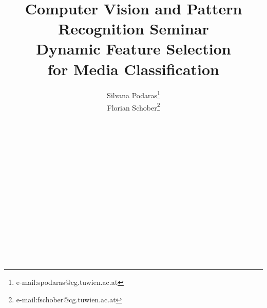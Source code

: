 \documentclass[conference,onecolumn]{acmsiggraph}
\title{
{
\phantom
\bigskip \\ \bigskip \\ \bigskip \\  \bigskip \\ 
\bigskip \\ \bigskip \\  \bigskip \\  \bigskip \\ 
\bigskip \\ \bigskip \\  \bigskip \\  \bigskip \\ 
\bigskip \\ \bigskip \\  \bigskip \\  \bigskip \\ 
\bigskip \\ \bigskip \\  \bigskip \\  \bigskip \\ 
\LARGE Computer Vision and Pattern Recognition Seminar } 
 \\ \medskip
 {\fontsize{36}{48} \selectfont 
  Dynamic Feature Selection
  \\ \medskip 
   for Media Classification}}
\author{Silvana Podaras\thanks{e-mail:spodaras@cg.tuwien.ac.at}\\Florian Schober\thanks{e-mail:fschober@cg.tuwien.ac.at}}
\begin{document}
\fontsize{10}{12} \selectfont
\renewcommand{\abstractname}{\fontsize{10}{12} \selectfont Abstract}


\maketitle
\copyrightspace
\bigskip \\ \bigskip \\ \bigskip \\  \bigskip \\ 
\bigskip \\ \bigskip \\  \bigskip \\  \bigskip \\ 
\bigskip \\ \bigskip \\  \bigskip \\  \bigskip \\ 

\newpage

\tableofcontents
\newpage






\fontsize{8}{10} \selectfont



\end{document}

